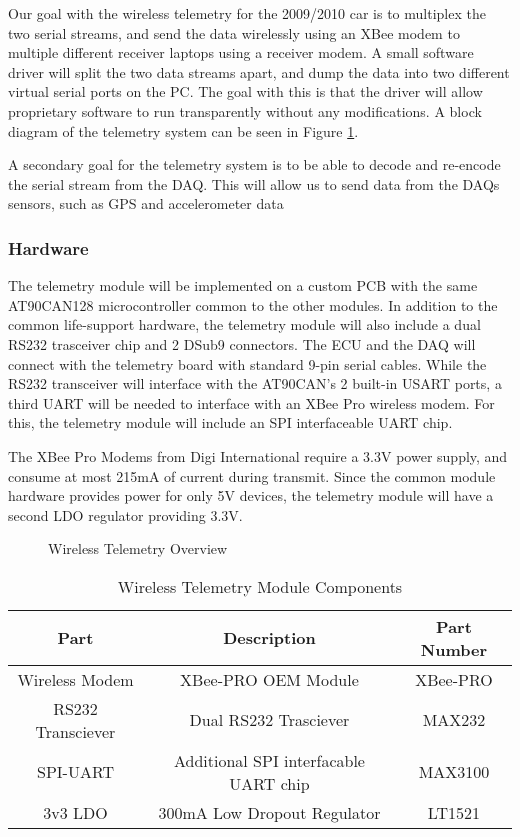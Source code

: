 Our goal with the wireless telemetry for the 2009/2010 car is to multiplex the two serial streams, and send the data wirelessly using an XBee modem to multiple different receiver laptops using a receiver modem. A small software driver will split the two data streams apart, and dump the data into two different virtual serial ports on the PC. The goal with this is that the driver will allow proprietary software to run transparently without any modifications. A block diagram of the telemetry system can be seen in Figure \ref{fig:Wireless-Telemetry-Overview}.

A secondary goal for the telemetry system is to be able to decode and re-encode the serial stream from the DAQ. This will allow us to send data from the DAQs sensors, such as GPS and accelerometer data 

\subsubsection{Hardware}
The telemetry module will be implemented on a custom PCB with the same AT90CAN128 microcontroller common to the other modules. In addition to the common life-support hardware, the telemetry module will also include a dual RS232 trasceiver chip and 2 DSub9 connectors. The ECU and the DAQ will connect with the telemetry board with standard 9-pin serial cables. While the RS232 transceiver will interface with the AT90CAN's 2 built-in USART ports, a third UART will be needed to interface with an XBee Pro wireless modem. For this, the telemetry module will include an SPI interfaceable UART chip.

The XBee Pro Modems from Digi International require a 3.3V power supply, and consume at most 215mA of current during transmit. Since the common module hardware provides power for only 5V devices, the telemetry module will have a second LDO regulator providing 3.3V.

  \begin{figure}[H]
    \begin{centering}
      
    \end{centering}

    \caption{Wireless Telemetry Overview\label{fig:Wireless-Telemetry-Overview}}
  \end{figure}

  \begin{table}[H]
    \caption{Wireless Telemetry Module Components\label{tab:Wireless-Telemetry-Module}}
    \begin{centering}
      \begin{tabular}{|c|c|c|}
	\hline 
	Part & Description & Part Number\tabularnewline
	\hline
	\hline
	Wireless Modem & XBee-PRO OEM Module & XBee-PRO\tabularnewline
	\hline 
	RS232 Transciever & Dual RS232 Trasciever & MAX232\tabularnewline
	\hline 
	SPI-UART & Additional SPI interfacable UART chip &
MAX3100\tabularnewline
	\hline 
	3v3 LDO & 300mA Low Dropout Regulator & LT1521\tabularnewline
	\hline
      \end{tabular}
    \end{centering}
  \end{table}

